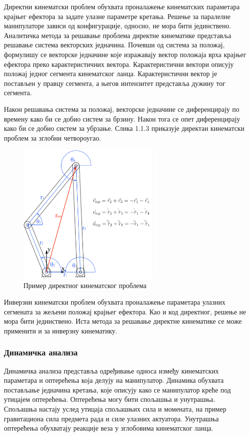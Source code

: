 \documentclass[12pt]{article}
\begin{document}
Директни кинематски проблем обухвата проналажење кинематских параметара крајњег ефектора за задате улазне параметре кретања. Решење за паралелне манипулаторе зависи од конфигурације, односно, не мора бити јединствено. Аналитичка метода за решавање проблема директне кинематике представља решавање система векторских једначина. Почевши од система за положај, формулишу се векторске једначине које изражавају вектор положаја врха крајњег ефектора преко карактеристичних вектора. Карактеристични вектори описују положај једног сегмента кинематског ланца. Карактеристични вектор је постављен у правцу сегмента, а његов интензитет представља дужину тог сегмента.

Након решавања система за положај, векторске једначине се диференцирају по времену како би се добио систем за брзину. Након тога се опет диференцирају како би се добио систем за убрзање. Слика 1.1.3 приказује директан кинематски проблем за зглобни четвороугао.

\begin{figure}[H]
    \centering
    \includegraphics[width=7cm]{figures/4bar.jpg}
    \caption{Пример директног кинематског проблема}
    \label{fig:дир_кин_пример}
\end{figure}

Инверзни кинематски проблем обухвата проналажење параметара улазних сегмената за жељени положај крајњег ефектора. Као и код директног, решење не мора бити јединствено. Иста метода за решавање директне кинематике се може применити и за инверзну кинематику.

\subsubsection{Динамичка анализа}
Динамичка анализа представља одређивање односа између кинематских параметара и оптерећења која делују на манипулатор. Динамика обухвата постављање једначина кретања, које описују како се манипулатор креће под утицајем оптерећења. Оптерећења могу бити спољашња и унутрашња. Спољашња настају услед утицаја спољашњих сила и момената, на пример гравитациона сила предмета рада и силе улазних актуатора. Унутрашња оптерећења обухватају реакције веза у зглобовима кинематског ланца.
\end{document}
